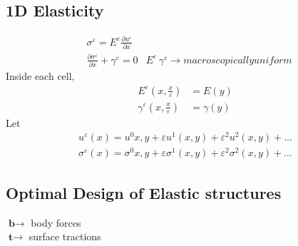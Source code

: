 \documentclass[10pt]{article}
\begin{document}
\subsection{1D Elasticity}
\begin{eqnarray}
&\sigma^\varepsilon = E^\varepsilon\frac{\partial u^\varepsilon}{\partial x}\\
&\frac{\partial \sigma^\varepsilon}{\partial x}+\gamma^\varepsilon=0 & E^\varepsilon \, \gamma^\varepsilon \rightarrow macroscopically uniform
\end{eqnarray}
Inside each cell, 
\begin{eqnarray}
E^\varepsilon (x, \frac{x}{\varepsilon})&=E(y) \\ 
\gamma^\varepsilon(x, \frac{x}{\varepsilon})&=\gamma(y)
\end{eqnarray} 
Let
\begin{eqnarray}
u^\varepsilon(x)=u^0{x,y}+\varepsilon u^1(x,y)+\varepsilon^2 u^2(x,y)+ ...\\
\sigma^\varepsilon(x)=\sigma^0{x,y}+\varepsilon \sigma^1(x,y)+\varepsilon^2 \sigma^2(x,y)+ ...
\end{eqnarray}


\subsection{Optimal Design of Elastic structures}

\begin{center}
$\textbf{b} \rightarrow$ body forces\\
$\textbf{t} \rightarrow$ surface tractions
\end{center}
\end{document}
